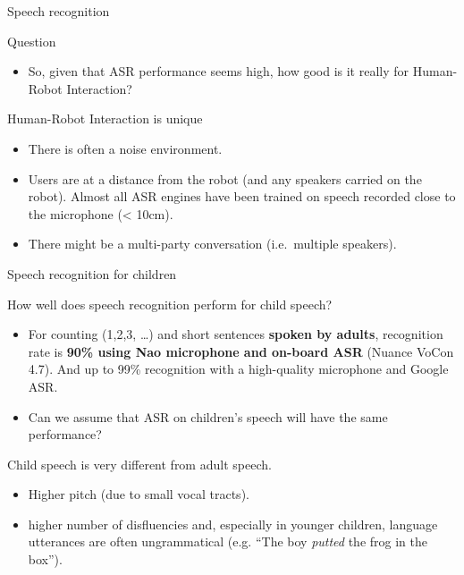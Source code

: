 \documentclass[compress]{beamer}
\begin{document}
\begin{frame}{Speech recognition}

Question

\begin{itemize}

\item So, given that ASR performance seems high, how good is it really for
  Human-Robot Interaction?
\end{itemize}

Human-Robot Interaction is unique

\begin{itemize}

\item There is often a noise environment.
\item Users are at a distance from the robot (and any speakers carried on
  the robot). Almost all ASR engines have been trained on speech
  recorded close to the microphone (\textless{} 10cm).
\item There might be a multi-party conversation (i.e.~multiple speakers).
\end{itemize}

\end{frame}

\begin{frame}{Speech recognition for children}

How well does speech recognition perform for child speech?

\begin{itemize}

\item For counting (1,2,3, \ldots{}) and short sentences \textbf{spoken by
  adults}, recognition rate is \textbf{90\% using Nao microphone and
  on-board ASR} (Nuance VoCon 4.7). And up to 99\% recognition with a
  high-quality microphone and Google ASR.
\item Can we assume that ASR on children's speech will have the same
  performance?
\end{itemize}

Child speech is very different from adult speech.

\begin{itemize}

\item Higher pitch (due to small vocal tracts).
\item higher number of disfluencies and, especially in younger children,
  language utterances are often ungrammatical (e.g. ``The boy
  \emph{putted} the frog in the box'').
\end{itemize}

\end{frame}
\end{document}

